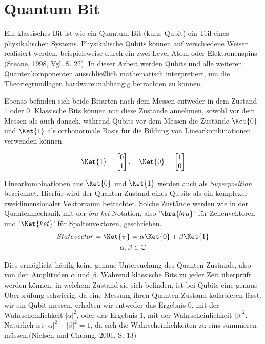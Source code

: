 \section{Quantum Bit}

Ein klassisches Bit ist wie ein Quantum Bit (kurz: Qubit) ein Teil eines physikalischen Systems. Physikalische Qubits können auf verschiedene Weisen realisiert werden, beispielsweise durch ein zwei-Level-Atom oder Elektronenspins (Steane, 1998, Vgl. S. 22). In dieser Arbeit werden Qubits und alle weiteren Quantenkomponenten ausschließlich mathematisch interpretiert, um die Theoriegrundlagen hardwareunabhängig betrachten zu können. \newline

Ebenso befinden sich beide Bitarten nach dem Messen entweder in dem Zustand 1 oder 0. Klassische Bits können nur diese Zustände annehmen, sowohl vor dem Messen als auch danach, während Qubits vor dem Messen die Zustände \(\Ket{0}\) und \(\Ket{1}\) als orthonormale Basis für die Bildung von Linearkombinationen verwenden können.

\[\Ket{1} = \begin{bmatrix} 0 \\ 1 \end{bmatrix}, \quad \Ket{0} = \begin{bmatrix} 1 \\ 0 \end{bmatrix}\]

Linearkombinationen aus \(\Ket{0}\) und \(\Ket{1}\) werden auch als \textit{Superposition} bezeichnet. Hierfür wird der Quanten-Zustand eines Qubits als ein komplexer zweidimensionaler Vektorraum betrachtet. Solche Zustände werden wie in der Quantenmechanik mit der \textit{bra-ket} Notation, also '\(\bra{bra}\)' für Zeilenvektoren und '\(\Ket{ket}\)' für Spaltenvektoren, geschrieben.
\begin{equation} \begin{gathered}
        Statevector = \Ket{\psi} = \alpha \Ket{0} + \beta  \Ket{1} \\
        \alpha,\beta \in \mathbb{C}
    \end{gathered} \end{equation}


Dies ermöglicht häufig keine genaue Untersuchung des Quanten-Zustands, also von den Amplituden \(\alpha\) und \(\beta\). Während klassische Bits zu jeder Zeit überprüft werden können, in welchem Zustand sie sich befinden, ist bei Qubits eine genaue Überprüfung schwierig, da eine Messung ihren Quanten Zustand kollabieren lässt. \glqqWenn wir ein Qubit messen, erhalten wir entweder das Ergebnis 0, mit der Wahrscheinlichkeit \(|\alpha|^2\), oder das Ergebnis 1, mit der Wahrscheinlichkeit \(|\beta|^2\). Natürlich ist \(|\alpha|^2 + |\beta|^2 = 1\), da sich die Wahrscheinlichkeiten zu eins summieren müssen.\grqq (Nielsen und Chuang, 2001, S. 13) \newline


